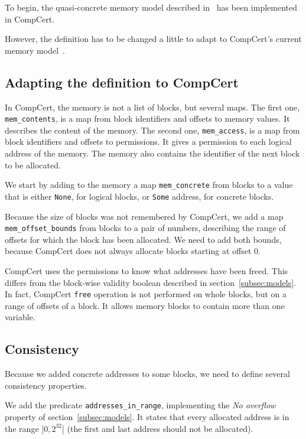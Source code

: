 \label{sec:memupdate}
To begin, the quasi-concrete memory model described in~\cite{DBLP:conf/pldi/KangHMGZV15} has been implemented in CompCert. 

However, the definition has to be changed a little to adapt to CompCert's current memory model~\cite{leroy:hal-00703441}.

\subsection{Adapting the definition to CompCert}
In CompCert, the memory is not a list of blocks, but several maps.
The first one, \texttt{mem\_contents}, is a map from block identifiers and offsets to memory values. It describes the content of the memory.
The second one, \texttt{mem\_access}, is a map from block identifiers and offsets to permissions. It gives a permission to each logical address of the memory.
The memory also contains the identifier of the next block to be allocated.

We start by adding to the memory a map \texttt{mem\_concrete} from blocks to a value that is either \texttt{None}, for logical blocks, or \texttt{Some} address, for concrete blocks.

Because the size of blocks was not remembered by CompCert, we add a map \texttt{mem\_offset\_bounds} from blocks to a pair of numbers, describing the range of offsets for which the block has been allocated. We need to add both bounds, because CompCert does not always allocate blocks starting at offset 0.

CompCert uses the permissions to know what addresses have been freed. This differs from the block-wise validity boolean described in section~\ref{subsec:models}.
In fact, CompCert \texttt{free} operation is not performed on whole blocks, but on a range of offsets of a block. It allows memory blocks to contain more than one variable.

\subsection{Consistency}
Because we added concrete addresses to some blocks, we need to define several consistency properties.

We add the predicate \texttt{addresses\_in\_range}, implementing the \textit{No overflow} property of section~\ref{subsec:models}. It states that every allocated address is in the range $]0,2^{32}[$ (the first and last address should not be allocated).

